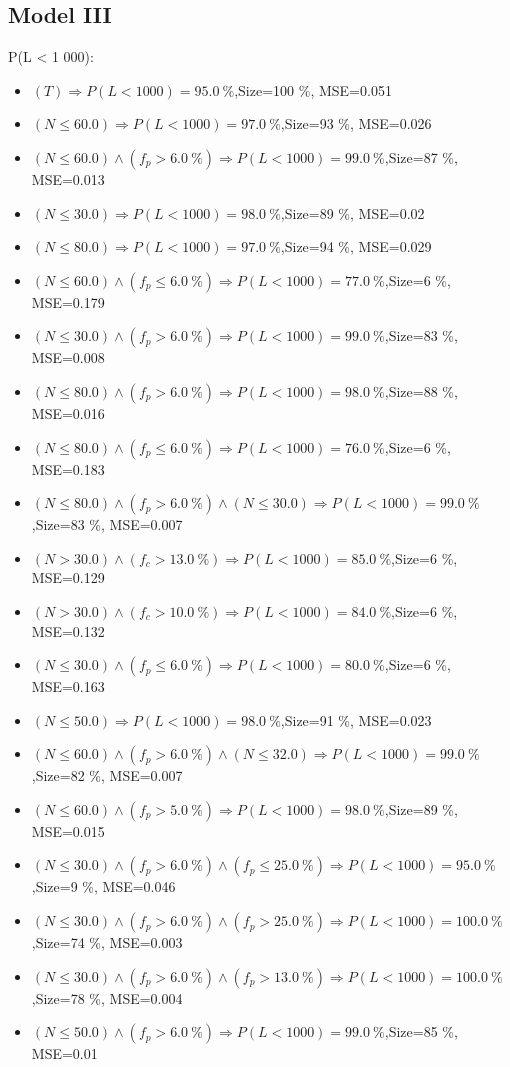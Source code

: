 \documentclass[numbered]{CSL}
\begin{document}
\subsection{Model III}
P(L < 1 000):
\begin{itemize}
\item $(T) \Rightarrow P(L < 1 000) = 95.0~\%$,\hfill Size=100 \%, MSE=0.051
\item $(N \leq 60.0) \Rightarrow P(L < 1 000) = 97.0~\%$,\hfill Size=93 \%, MSE=0.026
\item $(N \leq 60.0) \land (f_p > 6.0~\%) \Rightarrow P(L < 1 000) = 99.0~\%$,\hfill Size=87 \%, MSE=0.013
\item $(N \leq 30.0) \Rightarrow P(L < 1 000) = 98.0~\%$,\hfill Size=89 \%, MSE=0.02
\item $(N \leq 80.0) \Rightarrow P(L < 1 000) = 97.0~\%$,\hfill Size=94 \%, MSE=0.029
\item $(N \leq 60.0) \land (f_p \leq 6.0~\%) \Rightarrow P(L < 1 000) = 77.0~\%$,\hfill Size=6 \%, MSE=0.179
\item $(N \leq 30.0) \land (f_p > 6.0~\%) \Rightarrow P(L < 1 000) = 99.0~\%$,\hfill Size=83 \%, MSE=0.008
\item $(N \leq 80.0) \land (f_p > 6.0~\%) \Rightarrow P(L < 1 000) = 98.0~\%$,\hfill Size=88 \%, MSE=0.016
\item $(N \leq 80.0) \land (f_p \leq 6.0~\%) \Rightarrow P(L < 1 000) = 76.0~\%$,\hfill Size=6 \%, MSE=0.183
\item $(N \leq 80.0) \land (f_p > 6.0~\%) \land (N \leq 30.0) \Rightarrow P(L < 1 000) = 99.0~\%$,\hfill Size=83 \%, MSE=0.007
\item $(N > 30.0) \land (f_c > 13.0~\%) \Rightarrow P(L < 1 000) = 85.0~\%$,\hfill Size=6 \%, MSE=0.129
\item $(N > 30.0) \land (f_c > 10.0~\%) \Rightarrow P(L < 1 000) = 84.0~\%$,\hfill Size=6 \%, MSE=0.132
\item $(N \leq 30.0) \land (f_p \leq 6.0~\%) \Rightarrow P(L < 1 000) = 80.0~\%$,\hfill Size=6 \%, MSE=0.163
\item $(N \leq 50.0) \Rightarrow P(L < 1 000) = 98.0~\%$,\hfill Size=91 \%, MSE=0.023
\item $(N \leq 60.0) \land (f_p > 6.0~\%) \land (N \leq 32.0) \Rightarrow P(L < 1 000) = 99.0~\%$,\hfill Size=82 \%, MSE=0.007
\item $(N \leq 60.0) \land (f_p > 5.0~\%) \Rightarrow P(L < 1 000) = 98.0~\%$,\hfill Size=89 \%, MSE=0.015
\item $(N \leq 30.0) \land (f_p > 6.0~\%) \land (f_p \leq 25.0~\%) \Rightarrow P(L < 1 000) = 95.0~\%$,\hfill Size=9 \%, MSE=0.046
\item $(N \leq 30.0) \land (f_p > 6.0~\%) \land (f_p > 25.0~\%) \Rightarrow P(L < 1 000) = 100.0~\%$,\hfill Size=74 \%, MSE=0.003
\item $(N \leq 30.0) \land (f_p > 6.0~\%) \land (f_p > 13.0~\%) \Rightarrow P(L < 1 000) = 100.0~\%$,\hfill Size=78 \%, MSE=0.004
\item $(N \leq 50.0) \land (f_p > 6.0~\%) \Rightarrow P(L < 1 000) = 99.0~\%$,\hfill Size=85 \%, MSE=0.01
\end{itemize}
\end{document}

